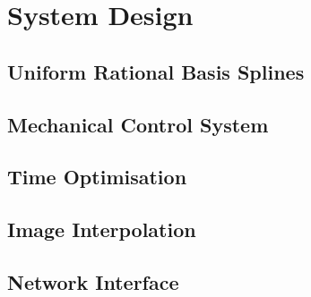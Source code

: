 \chapter{System Design}
\label{ch:design}



\section{Uniform Rational Basis Splines}
\label{sec:design-urbs}
	
	
	

\section{Mechanical Control System}
\label{sec:design-control}
	

\section{Time Optimisation}
\label{sec:design-optimisation}
	
	
	
	
	


\section{Image Interpolation}
\label{sec:design-interpolation}
		

\section{Network Interface}
\label{sec:network}
